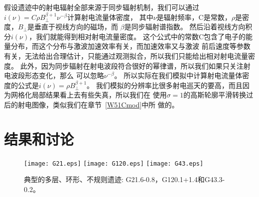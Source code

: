 假设遗迹中的射电辐射全部来源于同步辐射机制，我们可以通过
$i(\nu)=C\rho B_{\perp}^{\beta + 1}\nu^{-\beta}$计算射电流量体密度\citep{Orlando2007}，
其中$\nu$是辐射频率，C是常数，$\rho$是密度，$B_{\perp}$是垂直于视线方向的磁场，而
$\beta$是同步辐射谱指数。
然后沿着视线方向积分$i(\nu)$，我们就能得到相对射电流量密度。
这个公式中的常数C包含了电子的能量分布，而这个分布与激波加速效率有关，而加速效率又与激波
前后速度等参数有关，无法给出合理估计，只能通过观测拟合，所以我们只能给出相对射电流量密度。
此外，因为同步辐射在射电波段符合很好的幂律谱，所以我们如果只关注射电波段形态变化，那么
可以忽略$\nu^{-\beta}$。
所以实际在我们模拟中计算射电流量体密度的公式是$i(\nu)=\rho B_{\perp}^{\beta + 1}$。
我们模拟的分辨率比很多射电巡天的要高，而且因为网格化局部结果看上去有些失真，所以我们在
使用$\sigma = 1$的高斯轮廓平滑转换过后的射电图像，类似我们在章节~\ref{W51Cmod}中所
做的。


\section{结果和讨论}
\label{SWres}

\begin{figure*}
    \centering
    \texttt{[image: G21.eps]}
    \texttt{[image: G120.eps]}
    \texttt{[image: G43.eps]}
    \caption{典型的多层、环形、不规则遗迹: G21.6-0.8，G120.1+1.4和G43.3-0.2。 }
\label{fig:stat}
\end{figure*}

